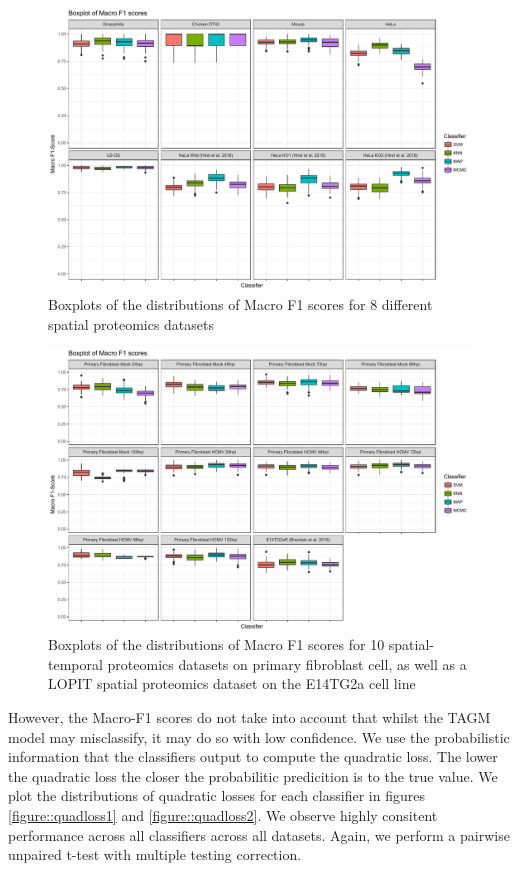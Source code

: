 \documentclass[12pt,english]{article}
\begin{document}
\begin{figure}[ht]
  \centering
\includegraphics[width=\textwidth]{F1compare1.pdf}
  \caption{Boxplots of the distributions of Macro F1 scores
    for 8 different spatial proteomics datasets}
  \label{figure::f1scores1}
\end{figure}

\begin{figure}[ht]
  \centering
\includegraphics[width=\textwidth]{F1comparisons2.pdf}
  \caption{Boxplots of the distributions of Macro F1 scores
    for 10 spatial-temporal proteomics datasets on primary fibroblast cell,
    as well as a LOPIT spatial proteomics dataset on the E14TG2a cell line }
  \label{figure::f1scores2}
\end{figure}

\clearpage

However, the Macro-F1 scores do not take into account that whilst the TAGM model may
misclassify, it may do so with low confidence. We use the probabilistic information
that the classifiers output to compute the quadratic loss. The lower the quadratic loss
the closer the probabilitic predicition is to the true value. We plot the distributions of
quadratic losses for each classifier in figures \ref{figure::quadloss1} and \ref{figure::quadloss2}. We observe highly consitent performance across all classifiers across all datasets. Again, we perform a
pairwise unpaired t-test with multiple testing correction.
\end{document}

